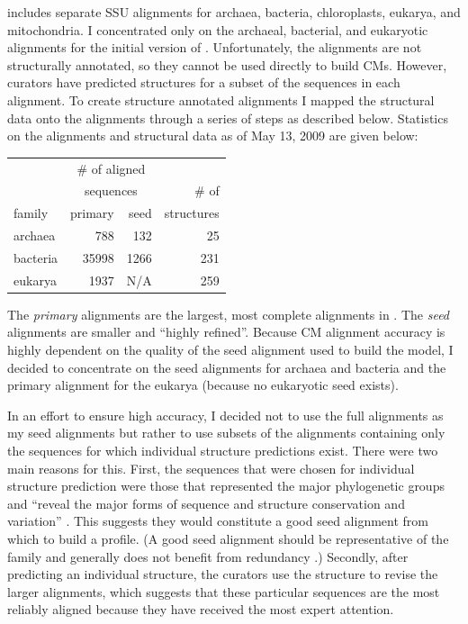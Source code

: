  includes separate SSU alignments for archaea, bacteria,
chloroplasts, eukarya, and mitochondria. I concentrated only
on the archaeal, bacterial, and eukaryotic alignments for the initial
version of .  Unfortunately, the  alignments
are not structurally annotated, so they cannot be used directly to
build CMs. However,  curators have predicted structures for a
subset of the sequences in each alignment.  To create structure
annotated alignments I mapped the structural data onto the alignments
through a series of steps as described below.  Statistics on the
 alignments and structural data as of May 13, 2009 are given
below:

\begin{center}
\begin{tabular}{l|rr|r}
       & \multicolumn{2}{c|}{\# of aligned}& \\
       & \multicolumn{2}{c|}{sequences}    & \# of \\ \cline {2-3}
family & primary & seed                   & structures \\ \hline
archaea&     788 &  132                   & 25 \\
bacteria&  35998 & 1266                   & 231 \\
eukarya&    1937 & N/A                    & 259 \\
\end{tabular}
\end{center}

The {\em primary} alignments are the largest, most complete alignments
in . The {\em seed} alignments are smaller and ``highly
refined''. Because CM alignment accuracy is highly dependent on the
quality of the seed alignment used to build the model, I decided to
concentrate on the seed alignments for archaea and bacteria and the
primary alignment for the eukarya (because no eukaryotic seed exists).

In an effort to ensure high accuracy, I decided not to
use the full  alignments as my seed alignments but rather to use
subsets of the alignments containing only the sequences for which
individual structure predictions exist.  There were two main reasons
for this. First, the sequences that were chosen for individual
structure prediction were those that represented the major
phylogenetic groups and ``reveal the major forms of sequence and
structure conservation and variation'' \cite{CannoneGutell02}. This
suggests they would constitute a good seed alignment from which to
build a profile. (A good seed alignment should be representative of
the family and generally does not benefit from redundancy
\cite{Durbin98}.) Secondly, after predicting an individual structure,
the  curators use the structure to revise the larger alignments,
which suggests that these particular sequences are the most reliably
aligned because they have received the most expert attention.

